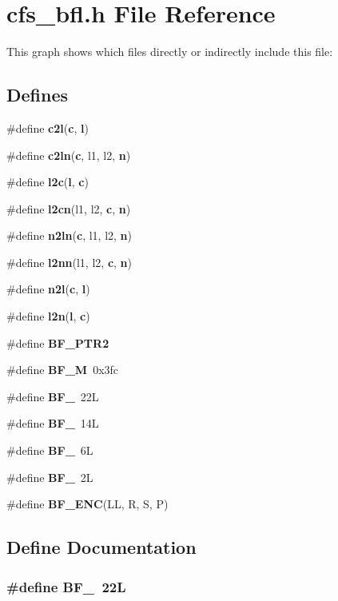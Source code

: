 \section{cfs\_\-bfl.h File Reference}
\label{cfs__bfl_8h}




This graph shows which files directly or indirectly include this file:\subsection*{Defines}
\begin{CompactItemize}
\item 
\#define {\bf c2l}({\bf c}, {\bf l})
\item 
\#define {\bf c2ln}({\bf c}, l1, l2, {\bf n})
\item 
\#define {\bf l2c}({\bf l}, {\bf c})
\item 
\#define {\bf l2cn}(l1, l2, {\bf c}, {\bf n})
\item 
\#define {\bf n2ln}({\bf c}, l1, l2, {\bf n})
\item 
\#define {\bf l2nn}(l1, l2, {\bf c}, {\bf n})
\item 
\#define {\bf n2l}({\bf c}, {\bf l})
\item 
\#define {\bf l2n}({\bf l}, {\bf c})
\item 
\#define {\bf BF\_\-PTR2}
\item 
\#define {\bf BF\_\-M}\ 0x3fc
\item 
\#define {\bf BF\_}\ 22L
\item 
\#define {\bf BF\_}\ 14L
\item 
\#define {\bf BF\_}\ 6L
\item 
\#define {\bf BF\_}\ 2L
\item 
\#define {\bf BF\_\-ENC}(LL, R, S, P)
\end{CompactItemize}


\subsection{Define Documentation}
\subsubsection{\setlength{\rightskip}{0pt plus 5cm}\#define BF\_\ 22L}\label{cfs__bfl_8h_a10}




